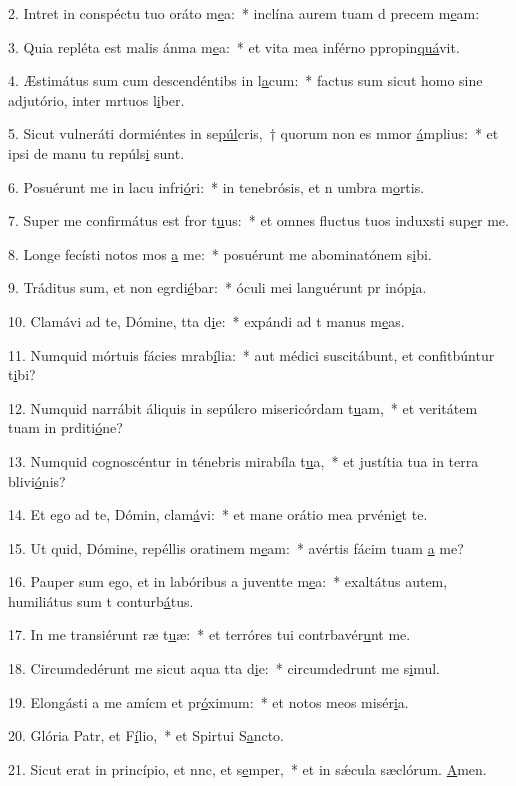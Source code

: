 2. Intret in conspéctu tuo oráto m\uline{e}a:~* inclína aurem tuam d precem m\uline{e}am:\par 
3. Quia repléta est malis ánma m\uline{e}a:~* et vita mea inférno ppropin\uline{quá}vit.\par 
4. Æstimátus sum cum descendéntibs in l\uline{a}cum:~* factus sum sicut homo sine adjutório, inter mrtuos l\uline{i}ber.\par 
5. Sicut vulneráti dormiéntes in se\uline{púl}cris,~† quorum non es mmor \uline{á}mplius:~* et ipsi de manu tu repúls\uline{i} sunt.\par 
6. Posuérunt me in lacu infri\uline{ó}ri:~* in tenebrósis, et n umbra m\uline{o}rtis.\par 
7. Super me confirmátus est fror t\uline{u}us:~* et omnes fluctus tuos induxsti sup\uline{e}r me.\par 
8. Longe fecísti notos mos \uline{a} me:~* posuérunt me abominatónem s\uline{i}bi.\par 
9. Tráditus sum, et non egrdi\uline{é}bar:~* óculi mei languérunt pr inóp\uline{i}a.\par 
10. Clamávi ad te, Dómine, tta d\uline{i}e:~* expándi ad t manus m\uline{e}as.\par 
11. Numquid mórtuis fácies mrab\uline{í}lia:~* aut médici suscitábunt, et confitbúntur t\uline{i}bi?\par 
12. Numquid narrábit áliquis in sepúlcro misericórdam t\uline{u}am,~* et veritátem tuam in prditi\uline{ó}ne?\par 
13. Numquid cognoscéntur in ténebris mirabíla t\uline{u}a,~* et justítia tua in terra blivi\uline{ó}nis?\par 
14. Et ego ad te, Dómin, clam\uline{á}vi:~* et mane orátio mea prvéni\uline{e}t te.\par 
15. Ut quid, Dómine, repéllis oratinem m\uline{e}am:~* avértis fácim tuam \uline{a} me?\par 
16. Pauper sum ego, et in labóribus a juventte m\uline{e}a:~* exaltátus autem, humiliátus sum t conturb\uline{á}tus.\par 
17. In me transiérunt ræ t\uline{u}æ:~* et terróres tui contrbavér\uline{u}nt me.\par 
18. Circumdedérunt me sicut aqua tta d\uline{i}e:~* circumdedrunt me s\uline{i}mul.\par 
19. Elongásti a me amícm et pr\uline{ó}ximum:~* et notos meos  misér\uline{i}a.\par 
20. Glória Patr, et F\uline{í}lio,~* et Spirtui S\uline{a}ncto.\par 
21. Sicut erat in princípio, et nnc, et s\uline{e}mper,~* et in sǽcula sæclórum. \uline{A}men.\par 
